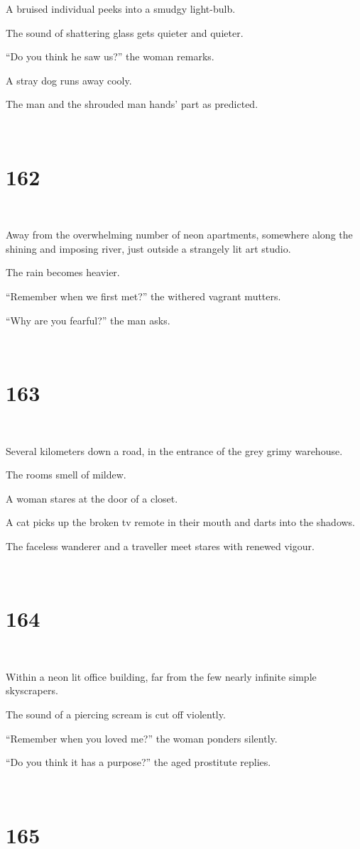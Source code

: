\documentclass{report}
\begin{document}
A bruised individual peeks into a smudgy light-bulb.

The sound of shattering glass gets quieter and quieter.

``Do you think he saw us?'' the woman remarks.

A stray dog runs away cooly.

The man and the shrouded man hands' part as predicted.

~
\chapter*{162}
~

Away from the overwhelming number of neon apartments, somewhere along the shining and imposing river, just outside a strangely lit art studio.

The rain becomes heavier.

``Remember when we first met?'' the withered vagrant mutters.

``Why are you fearful?'' the man asks.

~
\chapter*{163}
~

Several kilometers down a road, in the entrance of the grey grimy warehouse.

The rooms smell of mildew.

A woman stares at the door of a closet.

A cat picks up the broken tv remote in their mouth and darts into the shadows.

The faceless wanderer and a traveller meet stares with renewed vigour.

~
\chapter*{164}
~

Within a neon lit office building, far from the few nearly infinite simple skyscrapers.

The sound of a piercing scream is cut off violently.

``Remember when you loved me?'' the woman ponders silently.

``Do you think it has a purpose?'' the aged prostitute replies.

~
\chapter*{165}
~
\end{document}
